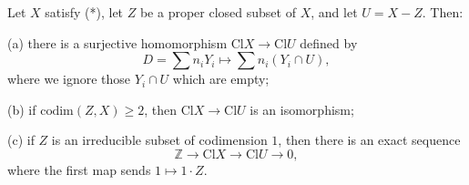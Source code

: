 Let $X$ satisfy (*), let $Z$ be a proper closed subset of $X$, and let $U = X - Z$. Then:

(a) there is a surjective homomorphism $\text{Cl} X \rightarrow \text{Cl} U$ defined by
$$D = \sum n_i Y_i \mapsto \sum n_i (Y_i \cap U),$$
where we ignore those $Y_i \cap U$ which are empty;

(b) if $\text{codim}(Z, X) \geq 2$, then $\text{Cl} X \rightarrow \text{Cl} U$ is an isomorphism;

(c) if $Z$ is an irreducible subset of codimension $1$, then there is an exact sequence
$$\mathbb{Z} \rightarrow \text{Cl} X \rightarrow \text{Cl} U \rightarrow 0,$$
where the first map sends $1 \mapsto 1 \cdot Z$.

